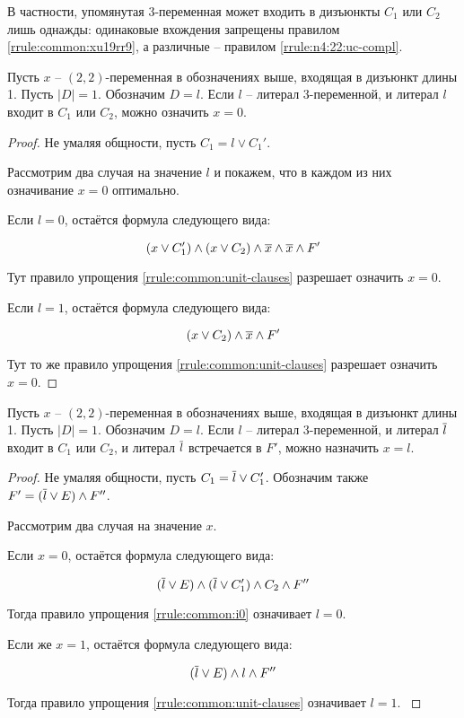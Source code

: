 В частности, упомянутая 3-переменная может входить в дизъюнкты $C_1$ или $C_2$ лишь однажды: одинаковые вхождения запрещены правилом \ref{rrule:common:xu19rr9}, а различные -- правилом \ref{rrule:n4:22:uc-compl}.

\begin{rrule}
 Пусть $x$ -- $(2,2)$-переменная в обозначениях выше, входящая в дизъюнкт длины 1. Пусть $|D| = 1$. Обозначим $D = l$. Если $l$ -- литерал 3-переменной, и литерал $l$ входит в $C_1$ или $C_2$, можно означить $x = 0$. 
 \label{rrule:n4:22:uc-3v-pos-c}
\end{rrule}

\begin{proof}
 Не умаляя общности, пусть $C_1 = l \vee C_1'$.

 Рассмотрим два случая на значение $l$ и покажем, что в каждом из них означивание $x = 0$ оптимально.

 Если $l = 0$, остаётся формула следующего вида:

 $$
  (x \vee C_1') \wedge (x \vee C_2) \wedge \overline{x} \wedge \overline{x} \wedge F'
 $$

 Тут правило упрощения \ref{rrule:common:unit-clauses} разрешает означить $x = 0$.

 Если $l = 1$, остаётся формула следующего вида:

 $$
  (x \vee C_2) \wedge \overline{x} \wedge F'
 $$

 Тут то же правило упрощения \ref{rrule:common:unit-clauses} разрешает означить $x = 0$.
\end{proof}

\begin{rrule}
 Пусть $x$ -- $(2,2)$-переменная в обозначениях выше, входящая в дизъюнкт длины 1. Пусть $|D| = 1$. Обозначим $D = l$. Если $l$ -- литерал 3-переменной, и литерал $\overline{l}$ входит в $C_1$ или $C_2$, и литерал $\overline{l}$ встречается в $F'$, можно назначить $x = l$.
 \label{rrule:n4:22:uc-3v-neg-c-neg-f}
\end{rrule}

\begin{proof}
 Не умаляя общности, пусть $C_1 = \overline{l} \vee C_1'$.
 Обозначим также $F' = (\overline{l} \vee E) \wedge F''$.

 Рассмотрим два случая на значение $x$.

 Если $x = 0$, остаётся формула следующего вида:

 $$
  (\overline{l} \vee E) \wedge (\overline{l} \vee C_1') \wedge C_2 \wedge F''
 $$

 Тогда правило упрощения \ref{rrule:common:i0} означивает $l = 0$.

 Если же $x = 1$, остаётся формула следующего вида:

 $$
  (\overline{l} \vee E) \wedge l \wedge F'' 
 $$

 Тогда правило упрощения \ref{rrule:common:unit-clauses} означивает $l = 1$.
 \label{rrule:n4:22:uc-3v-neg-c-pos-f}
\end{proof}

